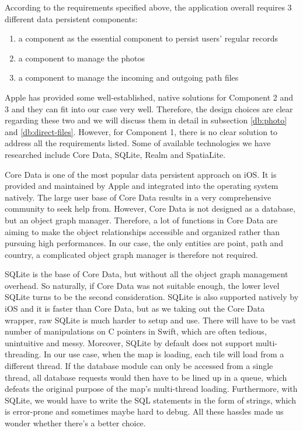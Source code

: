\documentclass[12pt,a4paper]{article}
\begin{document}
            According to the requirements specified above, the application overall requires 3 different data persistent components: 
                \begin{enumerate}
                    \setlength\itemsep{-0.5em}
                    \item a component as the essential component to persist users' regular records
                    \item a component to manage the photos
                    \item a component to manage the incoming and outgoing path files
                \end{enumerate}
            Apple has provided some well-established, native solutions for Component 2 and 3 and they can fit into our case very well. Therefore, the design choices are clear regarding these two and we will discuss them in detail in subsection \ref{db:photo} and \ref{db:direct-files}. However, for Component 1, there is no clear solution to address all the requirements listed. Some of available technologies we have researched include Core Data, SQLite, Realm and SpatiaLite.
                
            Core Data is one of the most popular data persistent approach on iOS. It is provided and maintained by Apple and integrated into the operating system natively. The large user base of Core Data results in a very comprehensive community to seek help from. However, Core Data is not designed as a database, but an object graph manager. Therefore, a lot of functions in Core Data are aiming to make the object relationships accessible and organized rather than pursuing high performances. In our case, the only entities are point, path and country, a complicated object graph manager is therefore not required.
            
            SQLite is the base of Core Data, but without all the object graph management overhead. So naturally, if Core Data was not suitable enough, the lower level SQLite turns to be the second consideration. SQLite is also supported natively by iOS and it is faster than Core Data, but as we taking out the Core Data wrapper, raw SQLite is much harder to setup and use. There will have to be vast number of manipulations on C pointers in Swift, which are often tedious, unintuitive and messy. Moreover, SQLite by default does not support multi-threading. In our use case, when the map is loading, each tile will load from a different thread. If the database module can only be accessed from a single thread, all database requests would then have to be lined up in a queue, which defeats the original purpose of the map's multi-thread loading. Furthermore, with SQLite, we would have to write the SQL statements in the form of strings, which is error-prone and sometimes maybe hard to debug. All these hassles made us wonder whether there’s a better choice.
\end{document}
